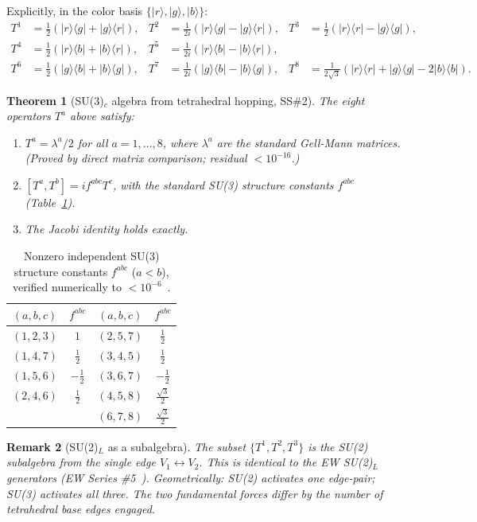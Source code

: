 \documentclass[11pt,a4paper]{article}
\newtheorem{theorem}{Theorem}[section]
\newtheorem{remark}[theorem]{Remark}
\newcommand{\ket}[1]{|#1\rangle}
\newcommand{\bra}[1]{\langle#1|}
\begin{document}
Explicitly, in the color basis
$\{\ket{r},\ket{g},\ket{b}\}$:
\begin{align*}
T^1 &= \tfrac{1}{2}(\ket{r}\bra{g}+\ket{g}\bra{r}),&
T^2 &= \tfrac{1}{2i}(\ket{r}\bra{g}-\ket{g}\bra{r}),&
T^3 &= \tfrac{1}{2}(\ket{r}\bra{r}-\ket{g}\bra{g}),\\
T^4 &= \tfrac{1}{2}(\ket{r}\bra{b}+\ket{b}\bra{r}),&
T^5 &= \tfrac{1}{2i}(\ket{r}\bra{b}-\ket{b}\bra{r}),\\
T^6 &= \tfrac{1}{2}(\ket{g}\bra{b}+\ket{b}\bra{g}),&
T^7 &= \tfrac{1}{2i}(\ket{g}\bra{b}-\ket{b}\bra{g}),&
T^8 &= \tfrac{1}{2\sqrt3}(\ket{r}\bra{r}+\ket{g}\bra{g}-2\ket{b}\bra{b}).
\end{align*}

\begin{theorem}[SU(3)$_c$ algebra from tetrahedral hopping, SS\#2]
\label{thm:su3}
The eight operators $T^a$ above satisfy:
\begin{enumerate}
\item $T^a = \lambda^a/2$ for all $a = 1,\ldots,8$, where
  $\lambda^a$ are the standard Gell-Mann matrices.
  (Proved by direct matrix comparison; residual $< 10^{-16}$.)
\item $[T^a, T^b] = if^{abc}T^c$, with the standard SU(3)
  structure constants $f^{abc}$ (Table~\ref{tab:fconst}).
\item The Jacobi identity holds exactly.
\end{enumerate}
\end{theorem}

\begin{table}[H]
\centering
\caption{Nonzero independent SU(3) structure constants $f^{abc}$
  ($a<b$), verified numerically to $<10^{-6}$~\citep{cpp_ss_mc}.}
\label{tab:fconst}
\begin{tabular}{@{}cccc@{}}
\toprule
$(a,b,c)$ & $f^{abc}$ & $(a,b,c)$ & $f^{abc}$ \\
\midrule
$(1,2,3)$ & $1$ & $(2,5,7)$ & $\tfrac{1}{2}$ \\
$(1,4,7)$ & $\tfrac{1}{2}$ & $(3,4,5)$ & $\tfrac{1}{2}$ \\
$(1,5,6)$ & $-\tfrac{1}{2}$ & $(3,6,7)$ & $-\tfrac{1}{2}$ \\
$(2,4,6)$ & $\tfrac{1}{2}$ & $(4,5,8)$ & $\tfrac{\sqrt{3}}{2}$ \\
& & $(6,7,8)$ & $\tfrac{\sqrt{3}}{2}$ \\
\bottomrule
\end{tabular}
\end{table}

\begin{remark}[SU(2)$_L$ as a subalgebra]
The subset $\{T^1,T^2,T^3\}$ is the SU(2) subalgebra from the
single edge $V_1\leftrightarrow V_2$.  This is identical to the
EW SU(2)$_L$ generators (EW Series \#5~\citep{cpp_ew5}).
Geometrically: SU(2) activates one edge-pair; SU(3) activates all
three.  The two fundamental forces differ by the number of
tetrahedral base edges engaged.
\end{remark}
\end{document}
